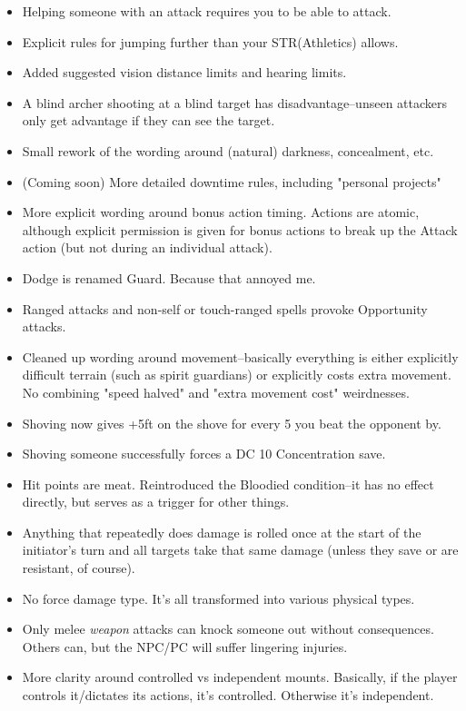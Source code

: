 \begin{itemize}
\begin{itemize}
    \end{itemize}
    \item Helping someone with an attack requires you to be able to attack.
    \item Explicit rules for jumping further than your STR(Athletics) allows.
    \item Added suggested vision distance limits and hearing limits.
    \item A blind archer shooting at a blind target has disadvantage--unseen attackers only get advantage if they can see the target.
    \item Small rework of the wording around (natural) darkness, concealment, etc.
    \item (Coming soon) More detailed downtime rules, including "personal projects"
    \item More explicit wording around bonus action timing. Actions are atomic, although explicit permission is given for bonus actions to break up the Attack action (but not during an individual attack).
    \item Dodge is renamed Guard. Because that annoyed me.
    \item Ranged attacks and non-self or touch-ranged spells provoke Opportunity attacks.
    \item Cleaned up wording around movement--basically everything is either explicitly difficult terrain (such as spirit guardians) or explicitly costs extra movement. No combining "speed halved" and "extra movement cost" weirdnesses.
    \item Shoving now gives +5ft on the shove for every 5 you beat the opponent by.
    \item Shoving someone successfully forces a DC 10 Concentration save.
    \item Hit points are meat. Reintroduced the Bloodied condition--it has no effect directly, but serves as a trigger for other things.
    \item Anything that repeatedly does damage is rolled once at the start of the initiator's turn and all targets take that same damage (unless they save or are resistant, of course).
    \item No force damage type. It's all transformed into various physical types.
    \item Only melee \textit{weapon} attacks can knock someone out without consequences. Others can, but the NPC/PC will suffer lingering injuries.
    \item More clarity around controlled vs independent mounts. Basically, if the player controls it/dictates its actions, it's controlled. Otherwise it's independent.
\end{itemize}
